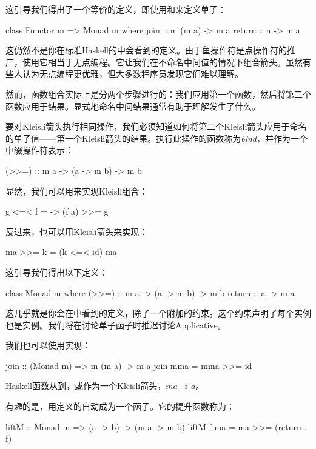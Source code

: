 \documentclass[DaoFP]{subfiles}
\begin{document}
    这引导我们得出了一个等价的定义，即使用和来定义单子：
    \begin{haskell}
        class Functor m => Monad m where
        join :: m (m a) -> m a
        return :: a -> m a
    \end{haskell}

    这仍然不是你在标准Haskell的中会看到的定义。由于鱼操作符\hask{<=<}是点操作符的推广，使用它相当于无点编程。它让我们在不命名中间值的情况下组合箭头。虽然有些人认为无点编程更优雅，但大多数程序员发现它们难以理解。

    然而，函数组合实际上是分两个步骤进行的：我们应用第一个函数，然后将第二个函数应用于结果。显式地命名中间结果通常有助于理解发生了什么。

    要对Kleisli箭头执行相同操作，我们必须知道如何将第二个Kleisli箭头应用于命名的单子值——第一个Kleisli箭头的结果。执行此操作的函数称为\emph{bind}，并作为一个中缀操作符表示：
    \begin{haskell}
    (>>=) :: m a -> (a -> m b) -> m b
    \end{haskell}
    显然，我们可以用来实现Kleisli组合：

    \begin{haskell}
        g <=< f = \a -> (f a) >>= g
    \end{haskell}

    反过来，也可以用Kleisli箭头来实现：
    \begin{haskell}
        ma >>= k = (k <=< id) ma
    \end{haskell}

    这引导我们得出以下定义：
    \begin{haskell}
        class Monad m where
        (>>=) :: m a -> (a -> m b) -> m b
        return :: a -> m a
    \end{haskell}
    这几乎就是你会在中看到的定义，除了一个附加的约束。这个约束声明了每个实例也是实例。我们将在讨论单子函子时推迟讨论Applicative。

    我们也可以使用实现：
    \begin{haskell}
        join  :: (Monad m) => m (m a) -> m a
        join mma =  mma >>= id
    \end{haskell}
    Haskell函数从到，或作为一个Kleisli箭头，$m a \twoheadrightarrow a$。

    有趣的是，用定义的自动成为一个函子。它的提升函数称为：
    \begin{haskell}
        liftM :: Monad m => (a -> b) -> (m a -> m b)
        liftM f ma = ma >>= (return . f)
    \end{haskell}
\end{document}
